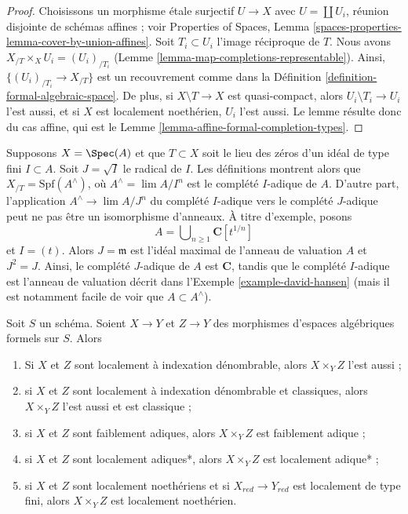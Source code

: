 \begin{proof}
Choisissons un morphisme étale surjectif $U \to X$ avec $U = \coprod U_i$,
réunion disjointe de schémas affines ; voir Properties of Spaces, Lemma
\ref{spaces-properties-lemma-cover-by-union-affines}.
Soit $T_i \subset U_i$ l'image réciproque de $T$.
Nous avons $X_{/T} \times_X U_i = (U_i)_{/T_i}$
(Lemme \ref{lemma-map-completions-representable}).
Ainsi, $\{(U_i)_{/T_i} \to X_{/T}\}$ est un recouvrement comme dans la
Définition \ref{definition-formal-algebraic-space}.
De plus, si $X \setminus T \to X$ est quasi-compact, alors
$U_i \setminus T_i \to U_i$ l'est aussi, et si $X$ est localement noethérien,
$U_i$ l'est aussi. Le lemme résulte donc du cas affine, qui est le
Lemme \ref{lemma-affine-formal-completion-types}.
\end{proof}

\begin{remark}[Avertissement]
\label{remark-warning-completion}
Supposons $X = \Spec(A)$ et que $T \subset X$ soit le lieu des zéros d'un
idéal de type fini $I \subset A$. Soit $J = \sqrt{I}$ le
radical de $I$. Les définitions montrent alors que
$X_{/T} = \text{Spf}(A^\wedge)$, où $A^\wedge = \lim A/I^n$ est
le complété $I$-adique de $A$. D'autre part, l'application
$A^\wedge \to \lim A/J^n$ du complété $I$-adique vers
le complété $J$-adique peut ne pas être un isomorphisme d'anneaux.
À titre d'exemple, posons
$$
A = \bigcup\nolimits_{n \geq 1} \mathbf{C}[t^{1/n}]
$$
et $I = (t)$. Alors $J = \mathfrak m$ est l'idéal maximal
de l'anneau de valuation $A$ et $J^2 = J$. Ainsi, le complété $J$-adique
de $A$ est $\mathbf{C}$, tandis que le complété $I$-adique
est l'anneau de valuation décrit dans l'Exemple \ref{example-david-hansen}
(mais il est notamment facile de voir que $A \subset A^\wedge$).
\end{remark}

\begin{lemma}
\label{lemma-types-fibre-products}
Soit $S$ un schéma. Soient $X \to Y$ et $Z \to Y$ des
morphismes d'espaces algébriques formels sur $S$. Alors
\begin{enumerate}
\item Si $X$ et $Z$ sont localement à indexation dénombrable, alors $X \times_Y Z$
l'est aussi ;
\item si $X$ et $Z$ sont localement à indexation dénombrable et classiques,
alors $X \times_Y Z$ l'est aussi et est classique ;
\item si $X$ et $Z$ sont faiblement adiques, alors $X \times_Y Z$
est faiblement adique ;
\item si $X$ et $Z$ sont localement adiques*, alors $X \times_Y Z$ est
localement adique* ;
\item si $X$ et $Z$ sont localement noethériens et si $X_{red} \to Y_{red}$
est localement de type fini, alors $X \times_Y Z$ est localement noethérien.
\end{enumerate}
\end{lemma}

